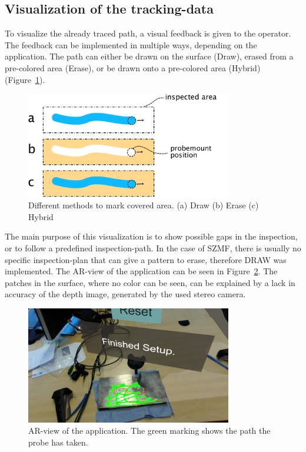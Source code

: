 \documentclass{VRARWorkshop}
\begin{document}
\subsection{Visualization of the tracking-data}
\label{sec:DrawVsErase}
To visualize the already traced path, a visual feedback is given to the operator.
The feedback can be implemented in multiple ways, depending on the application.
The path can either be drawn on the surface ({\sc Draw}), erased from a pre-colored area ({\sc Erase}), or be drawn onto a pre-colored area ({\sc Hybrid}) (Figure~\ref{fig:DrawVsErase}).
\begin{figure}[h!]
    \begin{center}
        \includegraphics[width=90mm]{images/DrawVsErase}
        \caption{\label{fig:DrawVsErase} Different methods to mark covered area. (a) {\sc Draw} (b) {\sc Erase} (c) {\sc Hybrid}}
    \end{center}
\end{figure}
The main purpose of this visualization is to show possible gaps in the inspection, or to follow a predefined inspection-path.
In the case of SZMF, there is usually no specific inspection-plan that can give a pattern to erase, therefore {\sc DRAW} was implemented.
The AR-view of the application can be seen in Figure~\ref{fig:ARView}.
The patches in the surface, where no color can be seen, can be explained by a lack in accuracy of the depth image, generated by the used stereo camera.
\begin{figure}[h!]
    \begin{center}
        \includegraphics[width=90mm]{images/AR-Screenshot}
        \caption{\label{fig:ARView} AR-view of the application. The green marking shows the path the probe has taken.}
    \end{center}
\end{figure}
\end{document}
